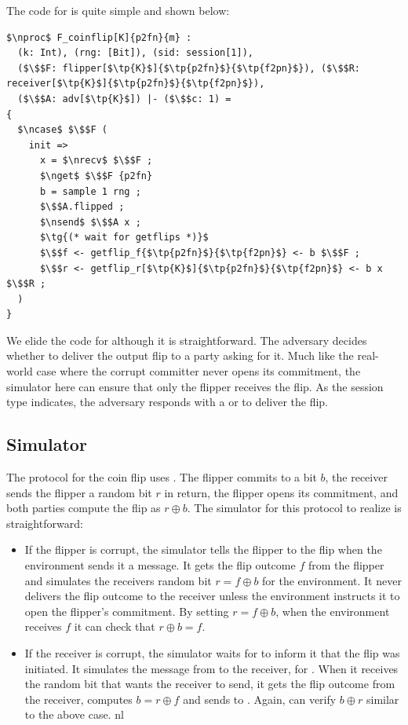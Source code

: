 The code for \Fflip is quite simple and shown below:
\begin{lstlisting}[basicstyle=\scriptsize\BeraMonottFamily, frame=single, mathescape]
$\nproc$ F_coinflip[K]{p2fn}{m} :
  (k: Int), (rng: [Bit]), (sid: session[1]),
  ($\$$F: flipper[$\tp{K}$]{$\tp{p2fn}$}{$\tp{f2pn}$}), ($\$$R: receiver[$\tp{K}$]{$\tp{p2fn}$}{$\tp{f2pn}$}),
  ($\$$A: adv[$\tp{K}$]) |- ($\$$c: 1) =
{
  $\ncase$ $\$$F (
    init =>
      x = $\nrecv$ $\$$F ;
      $\nget$ $\$$F {p2fn}
      b = sample 1 rng ;
      $\$$A.flipped ;
      $\nsend$ $\$$A x ;
      $\tg{(* wait for getflips *)}$
      $\$$f <- getflip_f{$\tp{p2fn}$}{$\tp{f2pn}$} <- b $\$$F ;
      $\$$r <- getflip_r[$\tp{K}$]{$\tp{p2fn}$}{$\tp{f2pn}$} <- b x $\$$R ;
  )
}
\end{lstlisting}
We elide the code for  although it is straightforward. 
The adversary decides whether to deliver the output flip to a party asking for it.
Much like the real-world case where the corrupt committer never opens its commitment, the simulator here can ensure that only the flipper receives the flip.
As the session type indicates, the adversary responds with a  or  to deliver the flip.

\subsection{Simulator}
The protocol for the coin flip uses \Fcom. 
The flipper commits to a bit $b$, the receiver sends the flipper a random bit $r$ in return, the flipper opens its commitment, and both parties compute the flip as $r \oplus b$.
The simulator for this protocol to realize \Fflip is straightforward:
\begin{itemize}
\item If the flipper is corrupt, the simulator tells the flipper to  the flip when the environment sends it a  message. It gets the flip outcome $f$ from the flipper and simulates the receivers random bit $r = f \oplus b$ for the environment. It never delivers the flip outcome to the receiver unless the environment instructs it to open the flipper's commitment. By setting $r = f \oplus b$, when the environment receives $f$ it can check that $r \oplus b = f$.
\item If the receiver is corrupt, the simulator waits for \Fflip to inform it that the flip was initiated. It simulates the  message from \Fcom to the receiver, for \Z. When it receives the random bit that \Z wants the receiver to send, it gets the flip outcome from the receiver, computes $b = r \oplus f$ and sends  to \Z. Again, \Z can verify $b \oplus r$ similar to the above case.
nl
\end{itemize}

